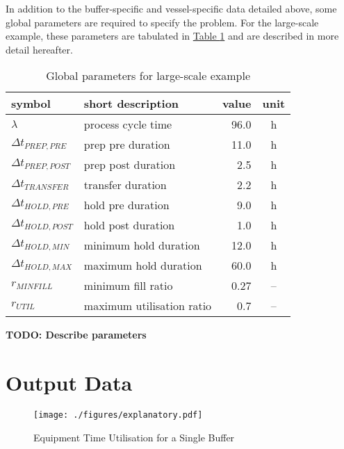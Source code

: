In addition to the buffer-specific and vessel-specific data detailed above,
some global parameters are required to specify the problem.
For the large-scale example, these parameters are tabulated in
\hyperref[tbl.parameters]{Table \ref*{tbl.parameters}} and are described in
more detail hereafter.
\begin{table}[h!]
    \centering
    \caption{Global parameters for large-scale example}
    \label{tbl.parameters}
    \begin{tabular}{l | l | r | c}
        symbol & short description & value & unit\\ \hline
        $\lambda$ & process cycle time & 96.0 & h\\
        $\Delta t_{\mathit{PREP,PRE}}$ & prep pre duration & 11.0 & h\\
        $\Delta t_{\mathit{PREP,POST}}$ & prep post duration & 2.5 & h\\
        $\Delta t_{\mathit{TRANSFER}}$ & transfer duration & 2.2 & h\\
        $\Delta t_{\mathit{HOLD,PRE}}$ & hold pre duration & 9.0 & h\\
        $\Delta t_{\mathit{HOLD,POST}}$ & hold post duration & 1.0 & h\\
        $\Delta t_{\mathit{HOLD,MIN}}$ & minimum hold duration & 12.0 & h\\
        $\Delta t_{\mathit{HOLD,MAX}}$ & maximum hold duration & 60.0 & h\\
        $r_{\mathit{MINFILL}}$ & minimum fill ratio & 0.27 & --\\
        $r_{\mathit{UTIL}}$ & maximum utilisation ratio & 0.7 & --\\
    \end{tabular}
\end{table}

\textbf{TODO: Describe parameters}

\section{Output Data}\label{S.outputdata}

\begin{figure}
    \centering
    \texttt{[image: ./figures/explanatory.pdf]}
    \caption{Equipment Time Utilisation for a Single Buffer}
    \label{fig.explanatory}
\end{figure}
